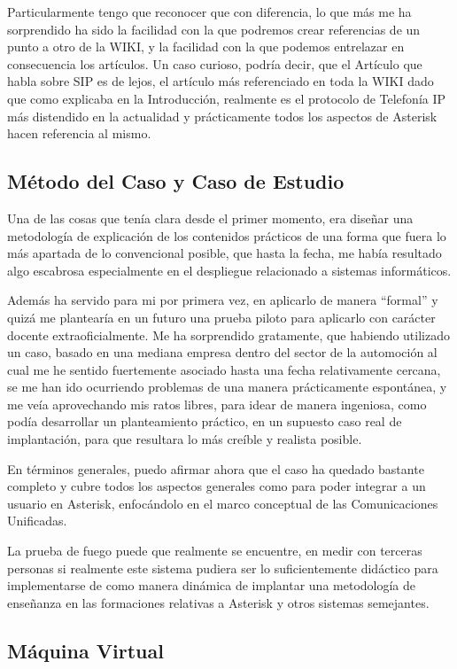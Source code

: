 Particularmente tengo que reconocer que con diferencia, lo que más me ha sorprendido ha sido la facilidad con la que podremos crear referencias de un punto a otro de la WIKI, y la facilidad con la que podemos entrelazar en consecuencia los artículos. Un caso curioso, podría decir, que el Artículo que habla sobre SIP es de lejos, el artículo más referenciado en toda la WIKI dado que como explicaba en la Introducción, realmente es el protocolo de Telefonía IP más distendido en la actualidad y prácticamente todos los aspectos de Asterisk hacen referencia al mismo.

\subsection{Método del Caso y Caso de Estudio}

Una de las cosas que tenía clara desde el primer momento, era diseñar una metodología de explicación de los contenidos prácticos de una forma que fuera lo más apartada de lo convencional posible, que hasta la fecha, me había resultado algo escabrosa especialmente en el despliegue relacionado a sistemas informáticos.

Además ha servido para mi por primera vez, en aplicarlo de manera ``formal'' y quizá me plantearía en un futuro una prueba piloto para aplicarlo con carácter docente extraoficialmente. Me ha sorprendido gratamente, que habiendo utilizado un caso, basado en una mediana empresa dentro del sector de la automoción al cual me he sentido fuertemente asociado hasta una fecha relativamente cercana, se me han ido ocurriendo problemas de una manera prácticamente espontánea, y me veía aprovechando mis ratos libres, para idear de manera ingeniosa, como podía desarrollar un planteamiento práctico, en un supuesto caso real de implantación, para que resultara lo más creíble y realista posible.

En términos generales, puedo afirmar ahora que el caso ha quedado bastante completo y cubre todos los aspectos generales como para poder integrar a un usuario en Asterisk, enfocándolo en el marco conceptual de las Comunicaciones Unificadas.

La prueba de fuego puede que realmente se encuentre, en medir con terceras personas si realmente este sistema pudiera ser lo suficientemente didáctico para implementarse de como manera dinámica de implantar una metodología de enseñanza en las formaciones relativas a Asterisk y otros sistemas semejantes.

\subsection{Máquina Virtual}

